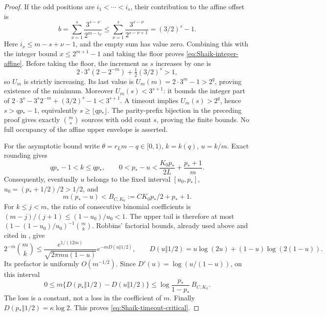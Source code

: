 \begin{proof}
If the odd positions are \(i_1<\cdots<i_s\), their contribution to
the affine offset is
\[
 b=\sum_{\nu=1}^s\frac{3^{s-\nu}}{2^{m-i_\nu}}
 \le\sum_{\nu=1}^s\frac{3^{s-\nu}}{2^{s-\nu+1}}
 =(3/2)^s-1.
\]
Here \(i_\nu\le m-s+\nu-1\), and the empty sum has value zero.
Combining this with the integer bound \(x\le2^{m+1}-1\) and taking
the floor proves \eqref{eq:Shaik-integer-affine}.
Before taking the floor, the increment as \(s\) increases by one is
\[
 2\cdot3^s(2-2^{-m})+\tfrac12(3/2)^s>1,
\]
so \(U_m\) is strictly increasing. Its last value is
\(U_m(m)=2\cdot3^m-1>2^q\), proving existence of the minimum.
Moreover \(U_m(s)<3^{s+1}\): it bounds the integer part of
\(2\cdot3^s-3^s2^{-m}+(3/2)^s-1<3^{s+1}\).
A timeout implies \(U_m(s)>2^q\), hence
\(s>qp_*-1\), equivalently \(s\ge\lfloor qp_*\rfloor\).
The parity-prefix bijection in the preceding proof gives exactly
\(\binom ms\) sources with odd count \(s\), proving the finite bounds.
No full occupancy of the affine upper envelope is asserted.

For the asymptotic bound write
\(\theta=r_Lm-q\in[0,1)\), \(k=k(q)\), \(u=k/m\).
Exact rounding gives
\[
 qp_*-1<k\le qp_*,\qquad
 0<p_*-u<
 \frac{K_0p_*}{2L}+\frac{p_*+1}{m}.
\]
Consequently, eventually \(u\) belongs to the fixed interval
\([u_0,p_*]\), \(u_0=(p_*+1/2)/2>1/2\), and
\[
 m(p_*-u)<B_{C,K_0}:=CK_0p_*/2+p_*+1.
\]
For \(k\le j<m\), the ratio of consecutive binomial coefficients
is \((m-j)/(j+1)\le(1-u_0)/u_0<1\).
The upper tail is therefore at most
\((1-(1-u_0)/u_0)^{-1}\binom mk\).
Robbins' factorial bounds, already used above and cited in
\cite{Robbins1955}, give
\[
 2^{-m}\binom mk\le
 \frac{e^{1/(12m)}}{\sqrt{2\pi m u(1-u)}}
 e^{-mD(u\Vert1/2)},\qquad
 D(u\Vert1/2)=u\log(2u)+(1-u)\log(2(1-u)).
\]
Its prefactor is uniformly \(O(m^{-1/2})\).
Since \(D'(u)=\log(u/(1-u))\), on this interval
\[
 0\le m\{D(p_*\Vert1/2)-D(u\Vert1/2)\}
 \le \log\frac{p_*}{1-p_*}\,B_{C,K_0}.
\]
The loss is a constant, not a loss in the coefficient of \(m\).
Finally \(D(p_*\Vert1/2)=\kappa\log2\). This proves
\eqref{eq:Shaik-timeout-critical}.
\end{proof}

